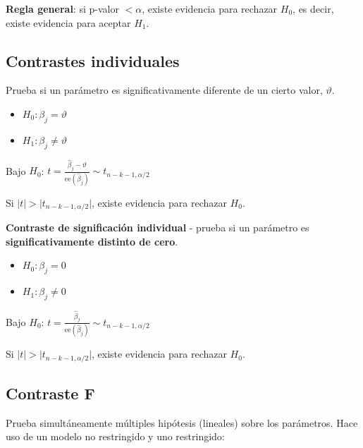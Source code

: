 \documentclass[10pt, a4paper, landscape]{article}
\newcommand{\se}{\mathrm{ee}}
\begin{document}
\begin{multicols}{3}
		\textbf{Regla general}: si p-valor $< \alpha$, existe evidencia para rechazar $H_{0}$, es decir, existe evidencia para aceptar $H_{1}$.
		
		\columnbreak
		
		\subsection*{Contrastes individuales}
		
		Prueba si un parámetro es significativamente diferente de un cierto valor, $\vartheta$.
		
		\begin{itemize}[leftmargin=*]
			\item $H_{0}: \beta_{j} = \vartheta$
			\item $H_{1}: \beta_{j} \neq \vartheta$
		\end{itemize}
		
		\begin{center}
			Bajo $H_{0}$: \quad $t = \frac{\hat{\beta}_{j} - \vartheta}{\se(\hat{\beta}_{j})} \sim t_{n - k - 1, \alpha/2}$
		\end{center}
		
		Si $\lvert t \rvert > \lvert t_{n - k - 1, \alpha/2} \rvert$, existe evidencia para rechazar $H_{0}$.
		
		\textbf{Contraste de significación individual} - prueba si un parámetro es \textbf{significativamente distinto de cero}.
		
		\begin{itemize}[leftmargin=*]
			\item $H_{0}: \beta_{j} = 0$
			\item $H_{1}: \beta_{j} \neq 0$
		\end{itemize}
		
		\begin{center}
			Bajo $H_{0}$: \quad $t = \frac{\hat{\beta}_{j}}{\se(\hat{\beta}_{j})}\sim t_{n - k - 1, \alpha/2}$
		\end{center}
		
		Si $\lvert t \rvert > \lvert t_{n - k - 1, \alpha/2} \rvert$, existe evidencia para rechazar $H_{0}$.
		
		\subsection*{Contraste F}
		
		Prueba simultáneamente múltiples hipótesis (lineales) sobre los parámetros. Hace uso de un modelo no restringido y uno restringido:
		

\end{multicols}
\end{document}
